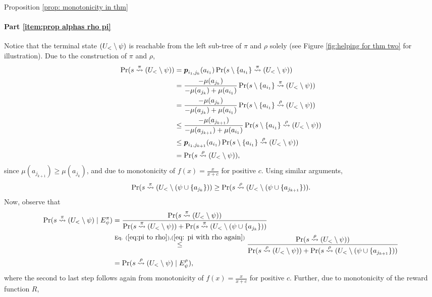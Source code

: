 \begin{proofof}{Proposition \ref{prop: monotonicity in thm}}
\paragraph{Part \ref{item:prop alphas rho pi}} 
Notice that the terminal state $(U_<\setminus \psi)$ is reachable from the left sub-tree of $\pi$ and $\rho$ solely (see Figure \ref{fig:helping for thm two} for illustration). Due to the construction of $\pi$ and $\rho$,
\begin{align}\label{eq:pi to rho}
\Pr(s\stackrel{\pi}{\rightsquigarrow}(U_<\setminus \psi))&= \boldsymbol{ p }_{{i_1},{j_k}}(a_{i_1})\Pr(s\setminus \{a_{i_1}\}\stackrel{\pi}{\rightsquigarrow}(U_<\setminus \psi))\nonumber\\
&=\frac{-\mu(a_{j_{k}})}{- \mu(a_{j_{k}})+ \mu(a_{i_{1}})} \Pr(s\setminus \{a_{i_1}\}\stackrel{\pi}{\rightsquigarrow}(U_<\setminus \psi))\nonumber\\
&=\frac{-\mu(a_{j_{k}})}{- \mu(a_{j_{k}})+ \mu(a_{i_{1}})} \Pr(s\setminus \{a_{i_1}\}\stackrel{\rho}{\rightsquigarrow}(U_<\setminus \psi))\nonumber\\
&\leq\frac{-\mu(a_{j_{k+1}})}{- \mu(a_{j_{k+1}})+ \mu(a_{i_{1}})} \Pr(s\setminus \{a_{i_1}\}\stackrel{\rho}{\rightsquigarrow}(U_<\setminus \psi))\nonumber\\
&\leq \boldsymbol{ p }_{{i_1},{j_{k+1}}}(a_{i_1})\Pr(s\setminus \{a_{i_1}\}\stackrel{\rho}{\rightsquigarrow}(U_<\setminus \psi))\nonumber \\
& = \Pr(s\stackrel{\rho}{\rightsquigarrow}(U_<\setminus \psi)),
\end{align}
since $\mu(a_{j_{k+1}})\geq \mu(a_{j_{k}})$, and due to monotonicity of $f(x)=\frac{x}{x+c}$ for positive $c$. Using similar arguments, 
\begin{align}\label{eq: pi with rho again}
\Pr(s\stackrel{\pi}{\rightsquigarrow}(U_<\setminus (\psi \cup \{a_{j_k}\})) \geq \Pr(s\stackrel{\rho}{\rightsquigarrow}(U_<\setminus (\psi \cup \{a_{j_{k+1}}\})).
\end{align}
Now, observe that
\begin{align}\label{eq: with Ez}
\Pr(s\stackrel{\pi}{\rightsquigarrow}(U_<\setminus \psi)\mid E^\pi_\psi)
&=\frac{\Pr(s\stackrel{\pi}{\rightsquigarrow}(U_<\setminus \psi))}{\Pr(s\stackrel{\pi}{\rightsquigarrow}(U_<\setminus \psi)) +\Pr(s\stackrel{\pi}{\rightsquigarrow}(U_<\setminus (\psi \cup \{a_{j_k}\}))} \nonumber\\
&\stackrel{\textnormal{Eq. }(\ref{eq:pi to rho}),(\ref{eq: pi with rho again})}{\leq} \frac{\Pr(s\stackrel{\rho}{\rightsquigarrow}(U_<\setminus \psi))}{\Pr(s\stackrel{\rho}{\rightsquigarrow}(U_<\setminus \psi)) +\Pr(s\stackrel{\rho}{\rightsquigarrow}(U_<\setminus (\psi \cup \{a_{j_{k+1}}\}))} \nonumber\\
&=\Pr(s\stackrel{\rho}{\rightsquigarrow}(U_<\setminus \psi)\mid E^\rho_\psi),
\end{align}
where the second to last step follows again from monotonicity of $f(x)=\frac{x}{x+c}$ for positive $c$. Further, due to monotonicity of the reward function $R$,

\end{proofof}
